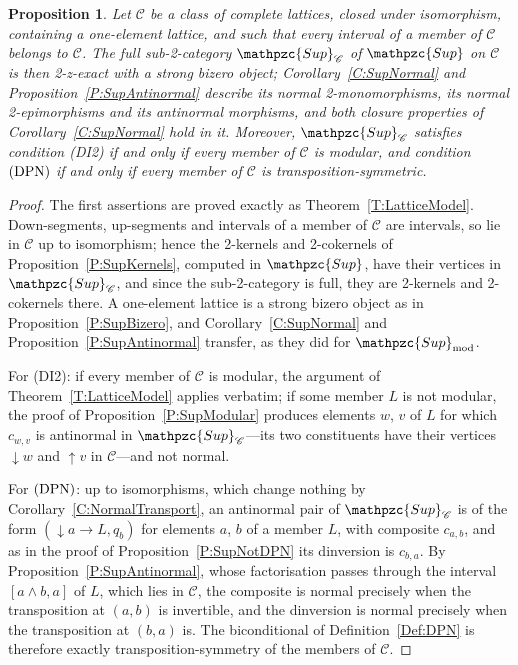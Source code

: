 \documentclass[reqno,a4paper]{amsart}
\numberwithin{equation}{section}
\theoremstyle{plain}
\newtheorem{proposition}[subsection]{Proposition}
\theoremstyle{definition}
\def\nameit#1{\textrm{#1}~}
\def\thex{\nameit{Theorem}}
\def\prox{\nameit{Proposition}}
\def\corx{\nameit{Corollary}}
\def\defx{\nameit{Definition}}
\newcommand{\catfont}[1]{\ensuremath{\mathpzc{#1}}\xspace}
\newcommand{\Sup}{\catfont{Sup}}
\newcommand{\Supmod}{\ensuremath{\mathpzc{Sup}_{\mathrm{mod}}}}
\renewcommand{\1}{\onecat{1}}
\newcommand{\dseg}[1]{\ensuremath{{\downarrow}#1}}
\newcommand{\useg}[1]{\ensuremath{{\uparrow}#1}}
\newcommand{\DPN}{\textup{(DPN)}}
\begin{document}
\begin{proposition}\label{P:SupClass}
	Let \(\mathcal{C}\) be a class of complete lattices, closed under isomorphism, containing a one-element lattice, and such that every interval of a member of \(\mathcal{C}\) belongs to \(\mathcal{C}\). The full sub-2-category \(\Sup_{\mathcal{C}}\) of \(\Sup\) on \(\mathcal{C}\) is then 2-z-exact with a strong bizero object; \corx\ref{C:SupNormal} and \prox\ref{P:SupAntinormal} describe its normal 2-monomorphisms, its normal 2-epimorphisms and its antinormal morphisms, and both closure properties of \corx\ref{C:SupNormal} hold in it. Moreover, \(\Sup_{\mathcal{C}}\) satisfies condition \textup{(DI2)} if and only if every member of \(\mathcal{C}\) is modular, and condition \(\DPN\) if and only if every member of \(\mathcal{C}\) is transposition-symmetric.
\end{proposition}
\begin{proof}
	The first assertions are proved exactly as \thex\ref{T:LatticeModel}. Down-segments, up-segments and intervals of a member of \(\mathcal{C}\) are intervals, so lie in \(\mathcal{C}\) up to isomorphism; hence the 2-kernels and 2-cokernels of \prox\ref{P:SupKernels}, computed in \(\Sup\), have their vertices in \(\Sup_{\mathcal{C}}\), and since the sub-2-category is full, they are 2-kernels and 2-cokernels there. A one-element lattice is a strong bizero object as in \prox\ref{P:SupBizero}, and \corx\ref{C:SupNormal} and \prox\ref{P:SupAntinormal} transfer, as they did for \(\Supmod\).

	For \textup{(DI2)}: if every member of \(\mathcal{C}\) is modular, the argument of \thex\ref{T:LatticeModel} applies verbatim; if some member \(L\) is not modular, the proof of \prox\ref{P:SupModular} produces elements \(w\), \(v\) of \(L\) for which \(c_{w,v}\) is antinormal in \(\Sup_{\mathcal{C}}\)---its two constituents have their vertices \(\dseg{w}\) and \(\useg{v}\) in \(\mathcal{C}\)---and not normal.

	For \(\DPN\): up to isomorphisms, which change nothing by \corx\ref{C:NormalTransport}, an antinormal pair of \(\Sup_{\mathcal{C}}\) is of the form \((\dseg{a}\to L,q_{b})\) for elements \(a\), \(b\) of a member \(L\), with composite \(c_{a,b}\), and as in the proof of \prox\ref{P:SupNotDPN} its dinversion is \(c_{b,a}\). By \prox\ref{P:SupAntinormal}, whose factorisation passes through the interval \([a\wedge b,a]\) of \(L\), which lies in \(\mathcal{C}\), the composite is normal precisely when the transposition at \((a,b)\) is invertible, and the dinversion is normal precisely when the transposition at \((b,a)\) is. The biconditional of \defx\ref{Def:DPN} is therefore exactly transposition-symmetry of the members of \(\mathcal{C}\).
\end{proof}
\end{document}
